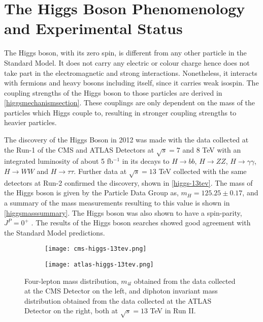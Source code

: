 \section{The Higgs Boson Phenomenology and Experimental Status}\label{higgs-status}

The Higgs boson, with its zero spin, is different from any other particle in the Standard Model. It does not carry any electric or colour charge hence does not take part in the electromagnetic and strong interactions. Nonetheless, it interacts with fermions and heavy bosons including itself, since it carries weak isospin. The coupling strengths of the Higgs boson to those particles are derived in \autoref{higgsmechanismsection}. These couplings are only dependent on the mass of the particles which Higgs couple to, resulting in stronger coupling strengths to heavier particles.

The discovery of the Higgs Boson in 2012 was made with the data collected at the Run-1 of the CMS and ATLAS Detectors at $\sqrt{s} = 7$ and $8$ TeV with an integrated luminosity of about 5 fb$^{-1}$ in its decays to $H\rightarrow bb$, $H\rightarrow ZZ$, $H\rightarrow \gamma\gamma$, $H\rightarrow WW$ and $H\rightarrow \tau\tau$. Further data at $\sqrt{s} = 13$ TeV collected with the same detectors at Run-2 confirmed the discovery, shown in \autoref{higgs-13tev}. The mass of the Higgs boson is given by the Particle Data Group\cite{pdg} as, $ m_H = 125.25\pm 0.17$, and a summary of the mass measurements resulting to this value is shown in \autoref{higgsmasssummary}. The Higgs boson was also shown to have a spin-parity, $J^P=0^+$ \cite{higgs-spin}. The results of the Higgs boson searches showed good agreement with the Standard Model predictions.

\begin{figure*}[ht]
        \centering
        \begin{subfigure}[b]{0.475\textwidth}
            \centering
            \texttt{[image: cms-higgs-13tev.png]}
            \vspace{-0.5cm}
        \end{subfigure}
        \hspace{0.2cm}
        \begin{subfigure}[b]{0.475\textwidth}  
            \centering 
            \texttt{[image: atlas-higgs-13tev.png]}
            \vspace{-0.5cm}
        \end{subfigure}
        \caption[Four-lepton mass distribution, $m_{4l}$ obtained from the data collected at the CMS Detector on the left, and diphoton invariant mass distribution obtained from the data collected at the ATLAS Detector on the right, both at $\sqrt{s}=13$ TeV in Run II.]
        {\small Four-lepton mass distribution, $m_{4l}$ obtained from the data collected at the CMS Detector\cite{cms-higgs-13tev} on the left, and diphoton invariant mass distribution obtained from the data collected at the ATLAS Detector\cite{atlas-higgs-13tev} on the right, both at $\sqrt{s}=13$ TeV in Run II.} 
        \label{higgs-13tev}
\end{figure*}

